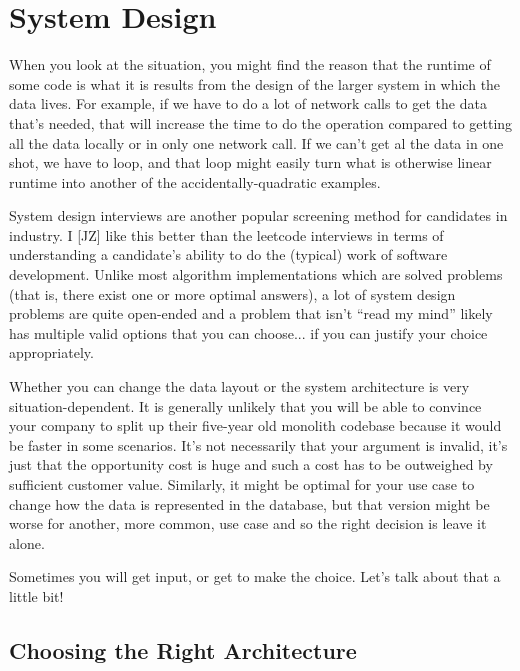 




\section*{System Design}
When you look at the situation, you might find the reason that the runtime of some code is what it is results from the design of the larger system in which the data lives. For example, if we have to do a lot of network calls to get the data that's needed, that will increase the time to do the operation compared to getting all the data locally or in only one network call. If we can't get al the data in one shot, we have to loop, and that loop might easily turn what is otherwise linear runtime into another of the accidentally-quadratic examples.

System design interviews are another popular screening method for candidates in industry. I [JZ] like this better than the leetcode interviews in terms of understanding a candidate's ability to do the (typical) work of software development. Unlike most algorithm implementations which are solved problems (that is, there exist one or more optimal answers), a lot of system design problems are quite open-ended and a problem that isn't ``read my mind'' likely has multiple valid options that you can choose... if you can justify your choice appropriately. 

Whether you can change the data layout or the system architecture is very situation-dependent. It is generally unlikely that you will be able to convince your company to split up their five-year old monolith codebase because it would be faster in some scenarios. It's not necessarily that your argument is invalid, it's just that the opportunity cost is huge and such a cost has to be outweighed by sufficient customer value. Similarly, it might be optimal for your use case to change how the data is represented in the database, but that version might be worse for another, more common, use case and so the right decision is leave it alone.

Sometimes you will get input, or get to make the choice. Let's talk about that a little bit!

\subsection*{Choosing the Right Architecture}

